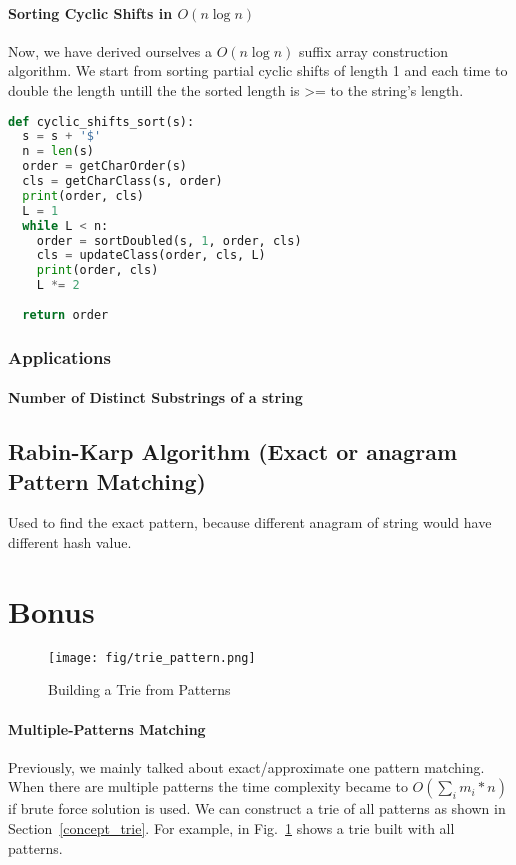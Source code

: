 \documentclass[../main.tex]{subfiles}
\begin{document}
\paragraph{Sorting Cyclic Shifts in $O(n\log n)$}  Now, we have derived ourselves a $O(n\log n)$ suffix array construction algorithm. We start from sorting partial cyclic shifts of length 1 and each time to double the length untill the the sorted length is >= to the string's length.

\begin{lstlisting}[language=Python]
def cyclic_shifts_sort(s):
  s = s + '$'
  n = len(s)
  order = getCharOrder(s)
  cls = getCharClass(s, order)
  print(order, cls)
  L = 1
  while L < n:
    order = sortDoubled(s, 1, order, cls)
    cls = updateClass(order, cls, L)
    print(order, cls)
    L *= 2
  
  return order
\end{lstlisting}

\subsubsection{Applications}
\paragraph{Number of Distinct Substrings of a string}
\subsection{Rabin-Karp Algorithm (Exact or anagram Pattern Matching) }
Used to find the exact pattern, because different anagram of string would have different hash value.

\section{Bonus}


\begin{figure}[h]
    \centering
    \texttt{[image: fig/trie\_pattern.png]}
    \caption{Building a Trie from Patterns}
    \label{fig:trie_pattern}
\end{figure}
\paragraph{Multiple-Patterns Matching} Previously, we mainly talked about exact/approximate one pattern matching. When there are multiple patterns the time complexity became to $O(\sum_i{m_i*n})$ if brute force solution is used. We can construct a trie of all patterns as shown in Section~\ref{concept_trie}. For example, in Fig.~\ref{fig:trie_pattern} shows a trie built with all patterns. 
\end{document}

